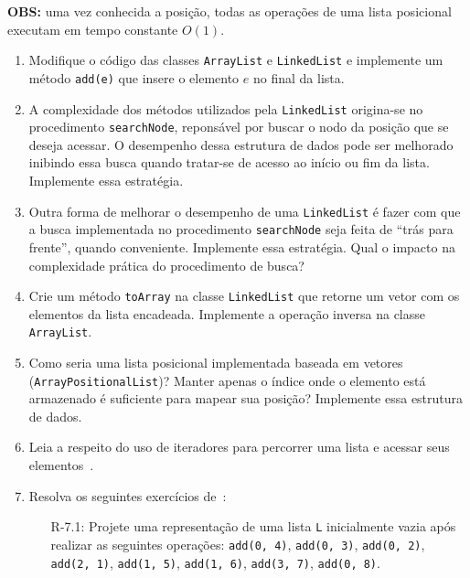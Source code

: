 \medskip

\textbf{OBS:} uma vez conhecida a posição, todas as operações de uma lista posicional executam em tempo constante $O(1)$.

\medskip


\begin{enumerate}
	\item Modifique o código das classes \texttt{ArrayList} e \texttt{LinkedList} e implemente um método \texttt{add(e)} que insere o elemento $e$ no final da lista.
	
	\item A complexidade dos métodos utilizados pela \texttt{LinkedList} origina-se no procedimento \texttt{searchNode}, reponsável por buscar o nodo da posição que se deseja acessar. O desempenho dessa estrutura de dados pode ser melhorado inibindo essa busca quando tratar-se de acesso ao início ou fim da lista. Implemente essa estratégia.
	
	\item Outra forma de melhorar o desempenho de uma \texttt{LinkedList} é fazer com que a busca implementada no procedimento \texttt{searchNode} seja feita de ``trás para frente'', quando conveniente. Implemente essa estratégia. Qual o impacto na complexidade prática do procedimento de busca?
	
	\item Crie um método \texttt{toArray} na classe \texttt{LinkedList} que retorne um vetor com os elementos da lista encadeada. Implemente a operação inversa na classe \texttt{ArrayList}.
	
	\item Como seria uma lista posicional implementada baseada em vetores (\texttt{ArrayPositionalList})? Manter apenas o índice onde o elemento está armazenado é suficiente para mapear sua posição? Implemente essa estrutura de dados.
	
	\item Leia a respeito do uso de iteradores para percorrer uma lista e acessar seus elementos~\citep{GoodrichEtAl2014}.
	
	\bigskip
	
	\item Resolva os seguintes exercícios de~\cite{GoodrichEtAl2014}:
	\begin{itemize}
		\item[R-7.1:] Projete uma representação de uma lista \texttt{L} inicialmente vazia após realizar as seguintes operações: \texttt{add(0,\,4)}, \texttt{add(0,\,3)}, \texttt{add(0,\,2)}, \texttt{add(2,\,1)}, \texttt{add(1,\,5)}, \texttt{add(1,\,6)}, \texttt{add(3,\,7)}, \texttt{add(0,\,8)}.
		

\end{itemize}
\end{enumerate}
